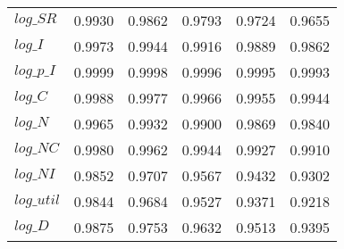 \begin{center}
\begin{longtable}{lccccc}
$log\_SR    $	 & 	     0.9930	 & 	     0.9862	 & 	     0.9793	 & 	     0.9724	 & 	     0.9655 \\ 
$log\_I     $	 & 	     0.9973	 & 	     0.9944	 & 	     0.9916	 & 	     0.9889	 & 	     0.9862 \\ 
$log\_p\_I  $	 & 	     0.9999	 & 	     0.9998	 & 	     0.9996	 & 	     0.9995	 & 	     0.9993 \\ 
$log\_C     $	 & 	     0.9988	 & 	     0.9977	 & 	     0.9966	 & 	     0.9955	 & 	     0.9944 \\ 
$log\_N     $	 & 	     0.9965	 & 	     0.9932	 & 	     0.9900	 & 	     0.9869	 & 	     0.9840 \\ 
$log\_NC    $	 & 	     0.9980	 & 	     0.9962	 & 	     0.9944	 & 	     0.9927	 & 	     0.9910 \\ 
$log\_NI    $	 & 	     0.9852	 & 	     0.9707	 & 	     0.9567	 & 	     0.9432	 & 	     0.9302 \\ 
$log\_util  $	 & 	     0.9844	 & 	     0.9684	 & 	     0.9527	 & 	     0.9371	 & 	     0.9218 \\ 
$log\_D     $	 & 	     0.9875	 & 	     0.9753	 & 	     0.9632	 & 	     0.9513	 & 	     0.9395 \\ 
\end{longtable}
 \end{center}
